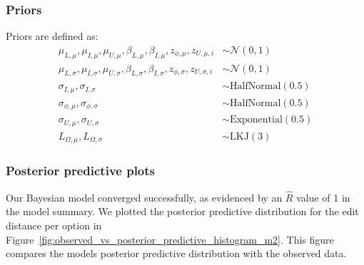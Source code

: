 \subsubsection{Priors}
Priors are defined as:
\begin{align}
    \mu_{L,\mu}, \mu_{I,\mu}, \mu_{U,\mu}, \beta_{L,\mu}, \beta_{I,\mu}, z_{\phi,\mu}, z_{U,\mu,i} &\sim \mathcal{N}(0, 1) \label{eq:priors_distance_model_2_mean} \\
    \mu_{L,\sigma}, \mu_{I,\sigma}, \mu_{U,\sigma}, \beta_{L,\sigma}, \beta_{I,\sigma}, z_{\phi,\sigma}, z_{U,\sigma,i} &\sim \mathcal{N}(0, 1) \label{eq:priors_distance_model_2_variance} \\
    \sigma_{I,\mu}, \sigma_{I,\sigma} &\sim  \text{HalfNormal}(0.5) \label{eq:priors_interface_distance_model_2} \\
    \sigma_{\phi,\mu}, \sigma_{\phi,\sigma} &\sim \text{HalfNormal}(0.5) \label{eq:priors_sigma_phi_distance_model_2} \\
    \sigma_{U,\mu}, \sigma_{U,\sigma} &\sim \text{Exponential}(0.5) \label{eq:priors_sigma_U_distance_model_2} \\
    L_{\Omega,\mu}, L_{\Omega,\sigma} &\sim \text{LKJ}(3) \label{eq:priors_L_Omega_distance_model_2}
\end{align}

\subsubsection{Posterior predictive plots}
Our Bayesian model converged successfully, as evidenced by an $\hat{R}$ value of 1 in the model summary. We plotted the posterior predictive distribution for the edit distance per option in Figure~\ref{fig:observed_vs_posterior_predictive_histogram_m2}. This figure compares the models posterior predictive distribution with the observed data.

